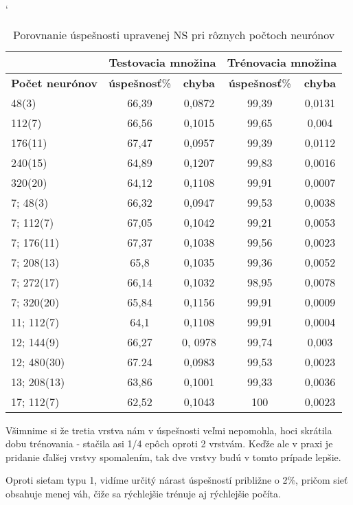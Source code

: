 \begin{table}[h]
\catcode` %
\centering
\begin{tabular}{|l|c|c|c|c|}
\cline{2-5}
\multicolumn{1}{l}{} & \multicolumn{2}{|c|}{\textbf{Testovacia množina}} & \multicolumn{2}{c|}{\textbf{Trénovacia množina}}\\ 
\hline
\textbf{Počet neurónov} & \textbf{úspešnosť}\% & \textbf{chyba} & \textbf{úspešnosť}\% & \textbf{chyba} \\ \hline
48(3)& 66,39 & 0,0872 & 99,39 & 0,0131 \\ \hline
112(7)& 66,56 & 0,1015 & 99,65 & 0,004 \\ \hline 
176(11)& 67,47 & 0,0957 & 99,39 & 0,0112 \\ \hline
240(15)& 64,89 & 0,1207 & 99,83 & 0,0016 \\ \hline
320(20)& 64,12 & 0,1108 & 99,91 & 0,0007 \\ \hline
7; 48(3)& 66,32 & 0,0947 & 99,53 & 0,0038 \\ \hline 
7; 112(7)& 67,05 & 0,1042 & 99,21 & 0,0053 \\ \hline 
7; 176(11)& 67,37 & 0,1038 & 99,56 & 0,0023 \\ \hline
7; 208(13)& 65,8  & 0,1035 & 99,36 & 0,0052 \\ \hline 
7; 272(17)& 66,14 & 0,1032 & 98,95 & 0,0078 \\ \hline 
7; 320(20)& 65,84& 0,1156 & 99,91 & 0,0009\\ \hline 
11; 112(7)& 64,1 & 0,1108 & 99,91 & 0,0004 \\ \hline
12; 144(9)& 66,27 & 0, 0978 & 99,74 & 0,003 \\ \hline
12; 480(30)& 67.24 & 0,0983 & 99,53 & 0,0023 \\ \hline 
13; 208(13)& 63,86 & 0,1001 & 99,33 & 0,0036 \\ \hline 
17; 112(7)& 62,52 & 0,1043 & 100 & 0,0023 \\ \hline
\end{tabular}
\caption{Porovnanie úspešnosti upravenej NS pri rôznych počtoch neurónov}
\label{tab:neuroncountcmp2}
\end{table}

Všimnime si že tretia vrstva nám v úspešnosti veľmi nepomohla, hoci skrátila dobu trénovania - stačila asi 1/4 epôch oproti 2 vrstvám. Keďže ale v praxi je pridanie ďalšej vrstvy spomalením, tak dve vrstvy budú v tomto prípade lepšie.

Oproti sieťam typu 1, vidíme určitý nárast úspešností približne o 2\%, pričom sieť obsahuje menej váh, čiže sa rýchlejšie trénuje aj rýchlejšie počíta.


